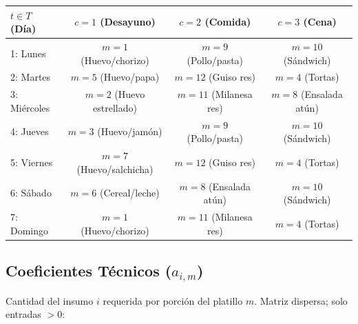 \documentclass[12pt, letterpaper]{article}
\begin{document}
\begin{table}[h!]
\centering
\begin{tabular}{lccc}
\toprule
$t \in T$ (Día) & $c=1$ (Desayuno) & $c=2$ (Comida) & $c=3$ (Cena) \\
\midrule
1: Lunes      & $m=1$ (Huevo/chorizo)    & $m=9$  (Pollo/pasta)   & $m=10$ (Sándwich) \\
2: Martes     & $m=5$ (Huevo/papa)       & $m=12$ (Guiso res)     & $m=4$  (Tortas)   \\
3: Miércoles  & $m=2$ (Huevo estrellado) & $m=11$ (Milanesa res)  & $m=8$  (Ensalada atún) \\
4: Jueves     & $m=3$ (Huevo/jamón)      & $m=9$  (Pollo/pasta)   & $m=10$ (Sándwich) \\
5: Viernes    & $m=7$ (Huevo/salchicha)  & $m=12$ (Guiso res)     & $m=4$  (Tortas)   \\
6: Sábado     & $m=6$ (Cereal/leche)     & $m=8$  (Ensalada atún) & $m=10$ (Sándwich) \\
7: Domingo    & $m=1$ (Huevo/chorizo)    & $m=11$ (Milanesa res)  & $m=4$  (Tortas)   \\
\bottomrule
\end{tabular}
\end{table}

\subsection{Coeficientes Técnicos ($a_{i,m}$)}

Cantidad del insumo $i$ requerida por porción del platillo $m$. Matriz dispersa; solo entradas $> 0$:
\end{document}
